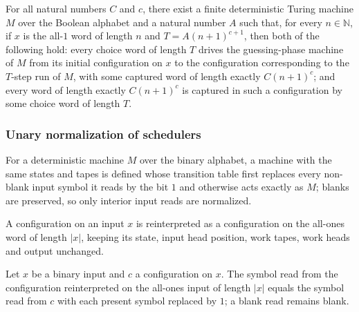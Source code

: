 \begin{lemma}
\label{Complexity.cont_poly_guess_phase}
\leanok
{}
For all natural numbers $C$ and $c$, there exist a finite deterministic Turing machine
$M$ over the Boolean alphabet and a natural number $A$ such that, for every
$n\in\mathbb{N}$, if $x$ is the all-$1$ word of length $n$ and $T=A(n+1)^{c+1}$, then
both of the following hold: every choice word of length $T$ drives the guessing-phase
machine of $M$ from its initial configuration on $x$ to the configuration corresponding
to the $T$-step run of $M$, with some captured word of length exactly $C(n+1)^c$; and
every word of length exactly $C(n+1)^c$ is captured in such a configuration by some
choice word of length $T$.
\end{lemma}

\subsubsection{Unary normalization of schedulers}

\begin{definition}
\label{Complexity.b2UnaryTM}
\leanok
{}
For a deterministic machine $M$ over the binary alphabet, a machine with the same states and tapes is defined whose transition table first replaces every non-blank input symbol it reads by the bit $1$ and otherwise acts exactly as $M$; blanks are preserved, so only interior input reads are normalized.
\end{definition}

\begin{definition}
\label{Complexity.b2UnaryCfg}
\leanok
{}
A configuration on an input $x$ is reinterpreted as a configuration on the all-ones word of length $|x|$, keeping its state, input head position, work tapes, work heads and output unchanged.
\end{definition}

\begin{lemma}
\label{Complexity.b2_unary_read}
\leanok
{}
Let $x$ be a binary input and $c$ a configuration on $x$. The symbol read from the
configuration reinterpreted on the all-ones input of length $|x|$ equals the symbol read
from $c$ with each present symbol replaced by $1$; a blank read remains blank.
\end{lemma}

